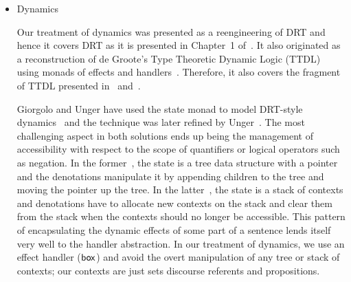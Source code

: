 \begin{itemize}
  We use deixis as the first example in
  Chapter~\ref{chap:introducing-effects}. Wanting to give an example of a
  handler for $\op{speaker}$ that appears within a lexical entry, we turned
  to direct quotations. However, the meanings that we give to sentences
  such as Example~\ref{ex:mary-peter} only express part of the
  meaning. Namely, we capture the fact that Peter claims that Mary kissed
  him. Nevertheless, the sentence also entails that Peter uttered the
  sentence ``Mary kissed me''. Therefore, in our analysis, the sentence in
  Example~\ref{ex:mary-peter} would be judged equivalent to the sentence in
  Example~\ref{ex:peter-mary}. The meaning of direct quotation does not
  depend only on the meaning of the quoted clause, but on its exact
  form. Since our system is strictly compositional,\footnote{Because we are
    using abstract categorial grammars for the syntax-semantics interface.}
  we would need to make it so that the meaning of every sentence is the
  sentence itself. More elaborate treatments of quotation can be found
  in~\cite{geurts2003quotation,potts2007dimensions,shan2010character}.

  \begin{exe}
    \ex Peter said ``Mary kissed me''. \label{ex:mary-peter}
    \ex Peter said ``I was kissed by Mary''. \label{ex:peter-mary}
  \end{exe}

  
\item Dynamics

  Our treatment of dynamics was presented as a reengineering of DRT and
  hence it covers DRT as it is presented in Chapter~1
  of~\cite{kamp1993discourse}. It also originated as a reconstruction of de
  Groote's Type Theoretic Dynamic Logic
  (TTDL)~\cite{de2006towards,lebedeva2012expression} using monads of
  effects and handlers~\cite{marsik2014algebraic}. Therefore, it also
  covers the fragment of TTDL presented in~\cite{de2006towards}
  and~\cite{lebedeva2012expression}.

  Giorgolo and Unger have used the state monad to model DRT-style
  dynamics~\cite{giorgolo2009coreference} and the technique was later
  refined by Unger~\cite{unger2012dynamic}. The most challenging aspect in
  both solutions ends up being the management of accessibility with respect
  to the scope of quantifiers or logical operators such as negation. In the
  former~\cite{giorgolo2009coreference}, the state is a tree data structure
  with a pointer and the denotations manipulate it by appending children to
  the tree and moving the pointer up the tree. In the
  latter~\cite{unger2012dynamic}, the state is a stack of contexts and
  denotations have to allocate new contexts on the stack and clear them
  from the stack when the contexts should no longer be accessible. This
  pattern of encapsulating the dynamic effects of some part of a sentence
  lends itself very well to the handler abstraction. In our treatment of
  dynamics, we use an effect handler ($\mathsf{box}$) and avoid the overt
  manipulation of any tree or stack of contexts; our contexts are just sets
  discourse referents and propositions.



\end{itemize}
